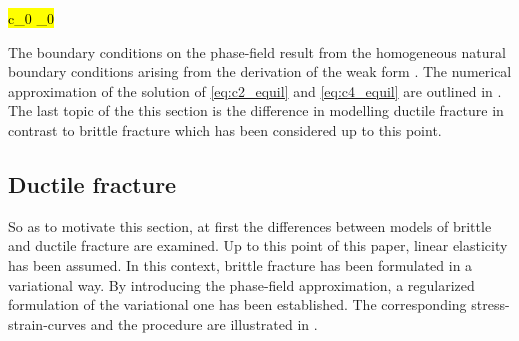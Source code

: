 \hl{ c_{0}  _{0} }

The boundary conditions on the phase-field result from the homogeneous natural boundary conditions arising from the derivation of the weak form \citep{11_PF_DissBorden}. The numerical approximation of the solution of \eqref{eq:c2_equil} and \eqref{eq:c4_equil} are outlined in . The last topic of the this section is the difference in modelling ductile fracture in contrast to brittle fracture which has been considered up to this point.

\subsection{Ductile fracture} \label{sec:ductile_frac}
So as to motivate this section, at first the differences between models of brittle and ductile fracture are examined. Up to this point of this paper, linear elasticity has been assumed. In this context, brittle fracture has been formulated in a variational way. By introducing the phase-field approximation, a regularized formulation of the variational one has been established. The corresponding stress-strain-curves and the procedure are illustrated in .
